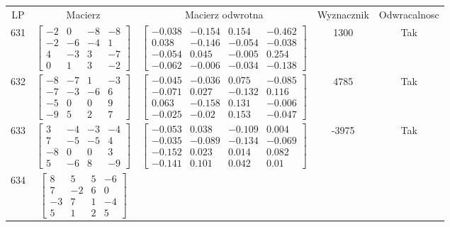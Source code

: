 \documentclass[a4paper,12pt]{article}
\begin{document}
\bgroup {} \vspace{0.2in} \begin{tabular}{c c c c c}
LP & Macierz & Macierz odwrotna & Wyznacznik & Odwracalnosc\\
631
&
$\begin{bmatrix} -2 & 0 & -8 & -8 \\ -2 & -6 & -4 & 1 \\ 4 & -3 & 3 & -7 \\ 0 & 1 & 3 & -2 \end{bmatrix}$
&
$\begin{bmatrix} -0.038 & -0.154 & 0.154 & -0.462 \\ 0.038 & -0.146 & -0.054 & -0.038 \\ -0.054 & 0.045 & -0.005 & 0.254 \\ -0.062 & -0.006 & -0.034 & -0.138 \end{bmatrix}$
&
1300
&
Tak
\\
632
&
$\begin{bmatrix} -8 & -7 & 1 & -3 \\ -7 & -3 & -6 & 6 \\ -5 & 0 & 0 & 9 \\ -9 & 5 & 2 & 7 \end{bmatrix}$
&
$\begin{bmatrix} -0.045 & -0.036 & 0.075 & -0.085 \\ -0.071 & 0.027 & -0.132 & 0.116 \\ 0.063 & -0.158 & 0.131 & -0.006 \\ -0.025 & -0.02 & 0.153 & -0.047 \end{bmatrix}$
&
4785
&
Tak
\\
633
&
$\begin{bmatrix} 3 & -4 & -3 & -4 \\ 7 & -5 & -5 & 4 \\ -8 & 0 & 0 & 3 \\ 5 & -6 & 8 & -9 \end{bmatrix}$
&
$\begin{bmatrix} -0.053 & 0.038 & -0.109 & 0.004 \\ -0.035 & -0.089 & -0.134 & -0.069 \\ -0.152 & 0.023 & 0.014 & 0.082 \\ -0.141 & 0.101 & 0.042 & 0.01 \end{bmatrix}$
&
-3975
&
Tak
\\
634
&
$\begin{bmatrix} 8 & 5 & 5 & -6 \\ 7 & -2 & 6 & 0 \\ -3 & 7 & 1 & -4 \\ 5 & 1 & 2 & 5 \end{bmatrix}$

\end{tabular}
\end{document}
